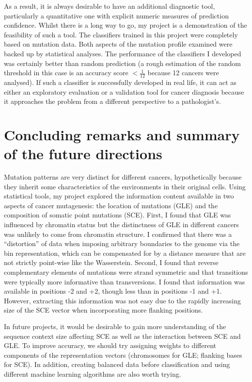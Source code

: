 As a result, it is always desirable to have an additional diagnostic tool, particularly a quantitative one with explicit numeric measures of prediction confidence. Whilst there is a long way to go, my project is a demonstration of the feasibility of such a tool. The classifiers trained in this project were completely based on mutation data. Both aspects of the mutation profile examined were backed up by statistical analyses. The performance of the classifiers I developed was certainly better than random prediction (a rough estimation of the random threshold in this case is an accuracy score $<\frac{1}{12}$ because 12 cancers were analysed). If such a classifier is successfully developed in real life, it can act as either an exploratory evaluation or a validation tool for cancer diagnosis because it approaches the problem from a different perspective to a pathologist's. 

\section{Concluding remarks and summary of the future directions}\label{discussion:conclusion}
Mutation patterns are very distinct for different cancers, hypothetically because they inherit some characteristics of the environments in their original cells. Using statistical tools, my project explored the information content available in two aspects of cancer mutagenesis: the location of mutations (GLE) and the composition of somatic point mutations (SCE). First, I found that GLE was influenced by chromatin status but the distinctness of GLE in different cancers was unlikely to come from chromatin structure. I confirmed that there was a ``distortion'' of data when imposing arbitrary boundaries to the genome via the bin representation, which can be compensated for by a distance measure that are not strictly point-wise like the Wasserstein. Second, I found that reverse complementary elements of mutations were strand symmetric and that transitions were typically more informative than transversions. I found that information was available in positions -2 and +2, though less than in positions -1 and +1. However, extracting this information was not easy due to the rapidly increasing size of the SCE vector when incorporating more flanking positions.

In future projects, it would be desirable to gain more understanding of the sequence context size affecting SCE as well as the interaction between SCE and GLE. To improve accuracy, we should try assigning weights to different components of the representation vectors (chromosomes for GLE; flanking bases for SCE). In addition, creating balanced data before classification and using different machine learning algorithms are also worth trying.